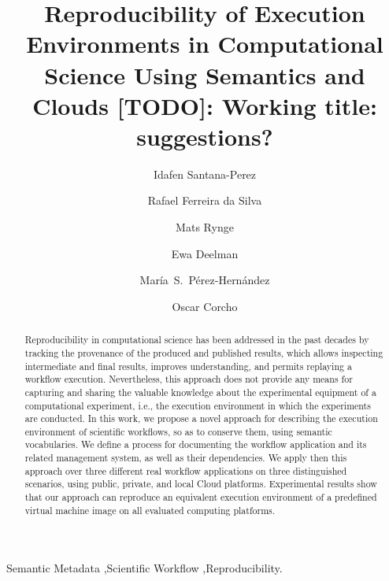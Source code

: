 \documentclass[final,5p,times,twocolumn]{elsarticle}
\newcommand{\note}[2][inline]{\color{red} [TODO]: #2\color{black}}
\begin{document}
\begin{frontmatter}

\title{Reproducibility of Execution Environments in Computational Science Using Semantics and Clouds
\note{Working title: suggestions?}}

\author[upm]{Idafen Santana-Perez}

\author[isi]{Rafael Ferreira da Silva}

\author[isi]{Mats Rynge}

\author[isi]{Ewa Deelman}

\author[upm]{Mar\'ia~S.~P\'erez-Hern\'andez}

\author[upm]{Oscar Corcho}


\address[upm]{Ontology Engineering Group, Universidad Polit\'ecnica de Madrid, Madrid, Spain }
\address[isi]{University of Southern California, Information Sciences Institute, Marina del Rey, CA, USA}


\begin{abstract}
Reproducibility in computational science has been addressed in the past decades 
by tracking the provenance of the produced and published results, which allows 
inspecting intermediate and final results, improves understanding, and permits 
replaying a workflow execution. Nevertheless, this approach does not provide any 
means for capturing and sharing the valuable knowledge about the experimental 
equipment of a computational experiment, i.e., the execution environment in which 
the experiments are conducted. In this work, we propose a novel approach for 
describing the execution environment of scientific workflows, so as to conserve them, 
using semantic vocabularies. We define a process for documenting the workflow 
application and its related management system, as well as their dependencies. 
We apply then this approach over three different real workflow applications on three 
distinguished scenarios, using public, private, and local Cloud platforms. Experimental 
results show that our approach can reproduce an equivalent execution environment of 
a predefined virtual machine image on all evaluated computing platforms.
\end{abstract}

\begin{keyword}
Semantic Metadata \sep Scientific Workflow \sep Reproducibility.
\end{keyword}


\end{frontmatter}
\end{document}
